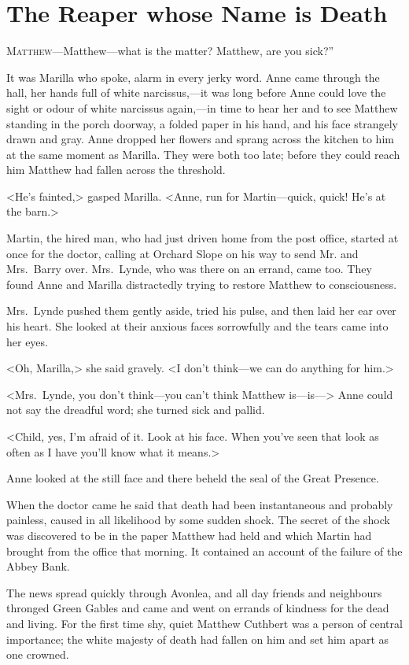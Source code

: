 \chapter{The Reaper whose Name is Death}

\lettrine[ante=“,]{M}{atthew}—Matthew—what is the matter? Matthew, are you sick?”

\zz
It was Marilla who spoke, alarm in every jerky word. Anne came through the hall, her hands full of white narcissus,—it was long before Anne could love the sight or odour of white narcissus again,—in time to hear her and to see Matthew standing in the porch doorway, a folded paper in his hand, and his face strangely drawn and gray. Anne dropped her flowers and sprang across the kitchen to him at the same moment as Marilla. They were both too late; before they could reach him Matthew had fallen across the threshold.

<He's fainted,> gasped Marilla. <Anne, run for Martin—quick, quick! He's at the barn.>

Martin, the hired man, who had just driven home from the post office, started at once for the doctor, calling at Orchard Slope on his way to send Mr. and Mrs.~Barry over. Mrs.~Lynde, who was there on an errand, came too. They found Anne and Marilla distractedly trying to restore Matthew to consciousness.

Mrs.~Lynde pushed them gently aside, tried his pulse, and then laid her ear over his heart. She looked at their anxious faces sorrowfully and the tears came into her eyes.

<Oh, Marilla,> she said gravely. <I don't think—we can do anything for him.>

<Mrs.~Lynde, you don't think—you can't think Matthew is—is—> Anne could not say the dreadful word; she turned sick and pallid.

<Child, yes, I'm afraid of it. Look at his face. When you've seen that look as often as I have you'll know what it means.>

Anne looked at the still face and there beheld the seal of the Great Presence.

When the doctor came he said that death had been instantaneous and probably painless, caused in all likelihood by some sudden shock. The secret of the shock was discovered to be in the paper Matthew had held and which Martin had brought from the office that morning. It contained an account of the failure of the Abbey Bank.

The news spread quickly through Avonlea, and all day friends and neighbours thronged Green Gables and came and went on errands of kindness for the dead and living. For the first time shy, quiet Matthew Cuthbert was a person of central importance; the white majesty of death had fallen on him and set him apart as one crowned.


